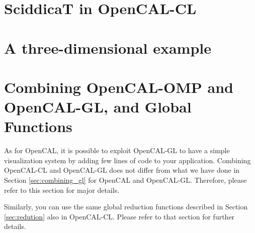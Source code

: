 

\section{SciddicaT in OpenCAL-CL}

\section{A three-dimensional example}

\section{Combining OpenCAL-OMP and OpenCAL-GL, and Global Functions}

As for OpenCAL, it is possible to exploit OpenCAL-GL to have a simple
visualization system by adding few lines of code to your
application. Combining OpenCAL-CL and OpenCAL-GL does not differ from
what we have done in Section \ref{sec:combining_gl} for OpenCAL and
OpenCAL-GL. Therefore, please refer to this section for major
details.

Similarly, you can use the same global reduction functions
described in Section \ref{sec:redution} also in OpenCAL-CL.  Please
refer to that section for further details.
